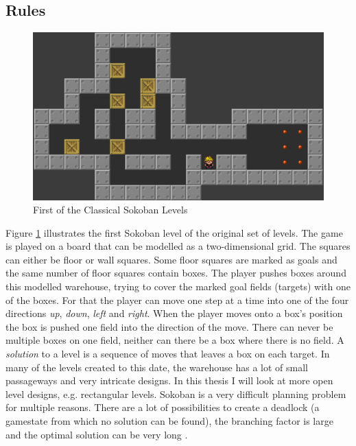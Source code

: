 \documentclass{article}
\begin{document}
\subsection{Rules}
\begin{figure}[h]
\centering
\includegraphics[scale=0.2]{SokobanLevel1}
\caption{First of the Classical Sokoban Levels}
\label{fig:1}
\end{figure}
Figure \ref{fig:1} illustrates the first Sokoban level of the original set of levels. The game is played on a board that can be modelled as a two-dimensional grid. The squares can either be floor or wall squares. Some floor squares are marked as goals and the same number of floor squares contain boxes. The player pushes boxes around this modelled warehouse, trying to cover the marked goal fields (targets) with one of the boxes. For that the player can move one step at a time into one of the four directions \textit{up}, \textit{down}, \textit{left} and \textit{right}. When the player moves onto a box's position the box is pushed one field into the direction of the move. There can never be multiple boxes on one field, neither can there be a box where there is no field. A \textit{solution} to a level is a sequence of moves that leaves a box on each target.
In many of the levels created to this date, the warehouse has a lot of small passageways and very intricate designs. In this thesis I will look at more open level designs, e.g. rectangular levels.
Sokoban is a very difficult planning problem for multiple reasons. There are a lot of possibilities to create a deadlock (a gamestate from which no solution can be found), the branching factor is large and the optimal solution can be very long \cite{BoteaHeuristicsVsPlanning}.

\end{document}

